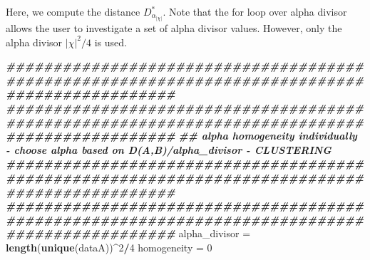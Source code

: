 \documentclass[
]{article}
\newenvironment{Shaded}{\begin{snugshade}}{\end{snugshade}}
\newcommand{\DecValTok}[1]{\textcolor[rgb]{0.00,0.00,0.81}{#1}}
\newcommand{\DocumentationTok}[1]{\textcolor[rgb]{0.56,0.35,0.01}{\textbf{\textit{#1}}}}
\newcommand{\FunctionTok}[1]{\textcolor[rgb]{0.13,0.29,0.53}{\textbf{#1}}}
\newcommand{\NormalTok}[1]{#1}
\newcommand{\OtherTok}[1]{\textcolor[rgb]{0.56,0.35,0.01}{#1}}
\newcommand{\SpecialCharTok}[1]{\textcolor[rgb]{0.81,0.36,0.00}{\textbf{#1}}}
\begin{document}
Here, we compute the distance \(D_{\alpha_{|\chi|}}^*\). Note that the
for loop over alpha divisor allows the user to investigate a set of
alpha divisor values. However, only the alpha divisor \(|\chi|^2/4\) is
used.

\begin{Shaded}
\begin{Highlighting}[]
\DocumentationTok{\#\#\#\#\#\#\#\#\#\#\#\#\#\#\#\#\#\#\#\#\#\#\#\#\#\#\#\#\#\#\#\#\#\#\#\#\#\#\#\#\#\#\#\#\#\#\#\#\#\#\#\#\#\#\#\#\#\#\#\#\#\#\#\#\#\#\#\#\#\#\#\#\#\#\#\#\#\#\#\#\#\#\#\#\#\#\#\#\#\#\#\#\#\#}
\DocumentationTok{\#\#\#\#\#\#\#\#\#\#\#\#\#\#\#\#\#\#\#\#\#\#\#\#\#\#\#\#\#\#\#\#\#\#\#\#\#\#\#\#\#\#\#\#\#\#\#\#\#\#\#\#\#\#\#\#\#\#\#\#\#\#\#\#\#\#\#\#\#\#\#\#\#\#\#\#\#\#\#\#\#\#\#\#\#\#\#\#\#\#\#\#\#\#}
\DocumentationTok{\#\# alpha homogeneity individually {-} choose alpha based on D(A,B)/alpha\_divisor {-} CLUSTERING}
\DocumentationTok{\#\#\#\#\#\#\#\#\#\#\#\#\#\#\#\#\#\#\#\#\#\#\#\#\#\#\#\#\#\#\#\#\#\#\#\#\#\#\#\#\#\#\#\#\#\#\#\#\#\#\#\#\#\#\#\#\#\#\#\#\#\#\#\#\#\#\#\#\#\#\#\#\#\#\#\#\#\#\#\#\#\#\#\#\#\#\#\#\#\#\#\#\#\#}
\DocumentationTok{\#\#\#\#\#\#\#\#\#\#\#\#\#\#\#\#\#\#\#\#\#\#\#\#\#\#\#\#\#\#\#\#\#\#\#\#\#\#\#\#\#\#\#\#\#\#\#\#\#\#\#\#\#\#\#\#\#\#\#\#\#\#\#\#\#\#\#\#\#\#\#\#\#\#\#\#\#\#\#\#\#\#\#\#\#\#\#\#\#\#\#\#\#\#}
\NormalTok{alpha\_divisor }\OtherTok{=} \FunctionTok{length}\NormalTok{(}\FunctionTok{unique}\NormalTok{(dataA))}\SpecialCharTok{\^{}}\DecValTok{2}\SpecialCharTok{/}\DecValTok{4} 
\NormalTok{homogeneity }\OtherTok{=} \DecValTok{0}


\end{Highlighting}
\end{Shaded}
\end{document}
